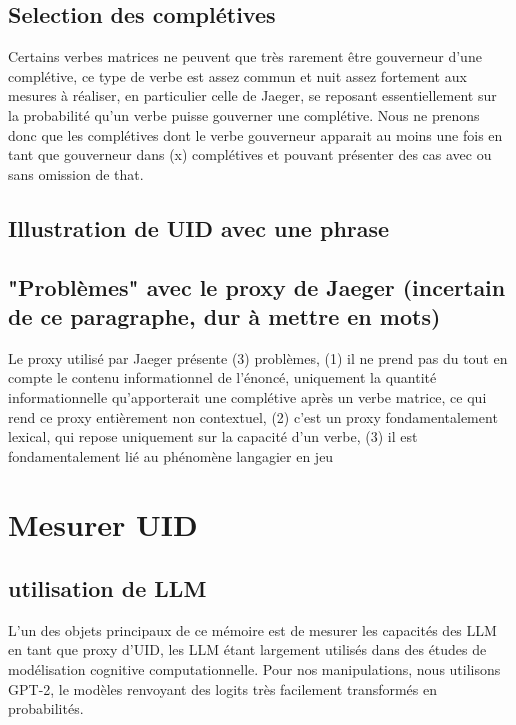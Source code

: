 \documentclass{article}
\begin{document}
\subsection{Selection des complétives}
Certains verbes matrices ne peuvent que très rarement être gouverneur d'une complétive, ce type de verbe est assez commun et nuit assez fortement aux mesures à réaliser, en particulier celle de Jaeger, se reposant essentiellement sur la probabilité qu'un verbe puisse gouverner une complétive. Nous ne prenons donc que les complétives dont le verbe gouverneur apparait au moins une fois en tant que gouverneur dans (x) complétives et pouvant présenter des cas avec ou sans omission de that. 

\subsection{Illustration de UID avec une phrase}

\subsection{"Problèmes" avec le proxy de Jaeger (incertain de ce paragraphe, dur à mettre en mots)}
Le proxy utilisé par Jaeger présente (3) problèmes, (1) il ne prend pas du tout en compte le contenu informationnel de l'énoncé, uniquement la quantité informationnelle qu'apporterait une complétive après un verbe matrice, ce qui rend ce proxy entièrement non contextuel, (2) c'est un proxy fondamentalement lexical, qui repose uniquement sur la capacité d'un verbe, (3) il est fondamentalement lié au phénomène langagier en jeu

\section{Mesurer UID}

\subsection{utilisation de LLM}
L'un des objets principaux de ce mémoire est de mesurer les capacités des LLM en tant que proxy d'UID, les LLM étant largement utilisés dans des études de modélisation cognitive computationnelle. Pour nos manipulations, nous utilisons GPT-2, le modèles renvoyant des logits très facilement transformés en probabilités.

\subsection{}
\end{document}
